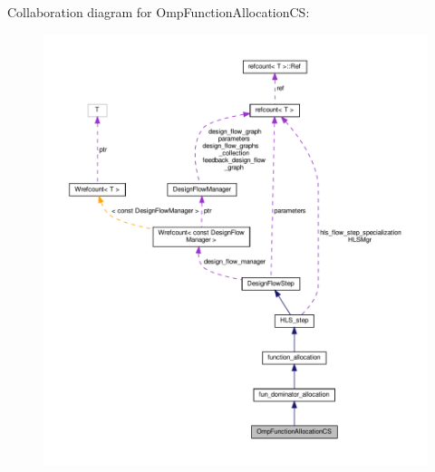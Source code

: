 Collaboration diagram for Omp\+Function\+Allocation\+CS\+:
\nopagebreak
\begin{figure}[H]
\begin{center}
\leavevmode
\includegraphics[width=350pt]{d2/da8/classOmpFunctionAllocationCS__coll__graph}
\end{center}
\end{figure}
